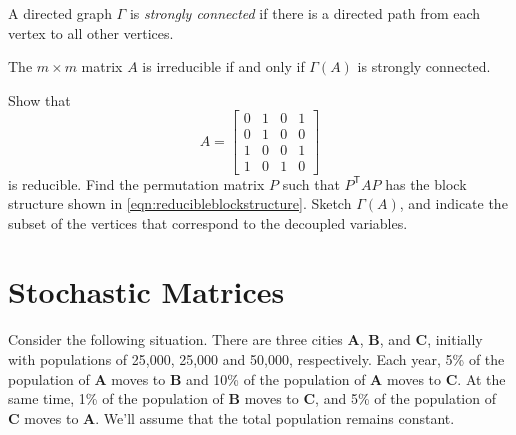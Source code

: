\begin{definition}
A directed graph $\Gamma$ is \emph{strongly connected}
if there is a directed path from each vertex to all other vertices.
\end{definition}
\begin{theorem}
The $m\times m$ matrix $A$ is irreducible if and only if $\Gamma(A)$
is strongly connected.
\end{theorem}

\newpage
\begin{exercises}
\begin{exercise}
Show that
\begin{equation}
   A = \begin{bmatrix}
                0 & 1 & 0 & 1 \\
                0 & 1 & 0 & 0 \\ 1 & 0 & 0 & 1 \\ 1 & 0 & 1 & 0
       \end{bmatrix}
\end{equation}
is reducible.  Find the permutation matrix $P$ such that $P^{\textsf{T}}AP$
has the block structure shown in \eqref{eqn:reducibleblockstructure}.
Sketch $\Gamma(A)$, and indicate the subset of the vertices
that correspond to the decoupled variables.
\end{exercise}
\end{exercises}
%
\newpage
%
\section{Stochastic Matrices}
Consider the following situation.
There are three cities \textbf{A}, \textbf{B}, and \textbf{C}, initially with
populations of 25,000, 25,000 and 50,000, respectively.
Each year, 5\% of the population of \textbf{A} moves to \textbf{B}
and 10\% of the population of \textbf{A} moves to \textbf{C}.
At the same time, 1\% of the population of \textbf{B} moves to \textbf{C},
and 5\% of the population of \textbf{C} moves to \textbf{A}.
We'll assume that the total population remains constant.

